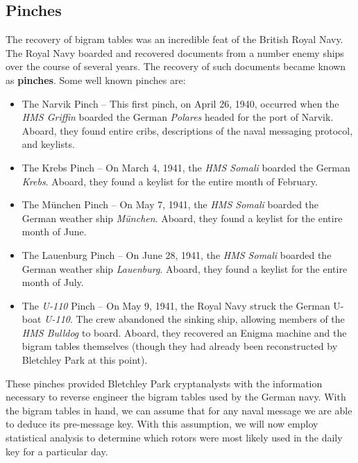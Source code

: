   \subsection{Pinches}
  The recovery of bigram tables was an incredible feat of the British Royal Navy. The Royal Navy boarded and recovered documents from a number enemy ships over the course of several years. The recovery of such documents became known as {\bf{pinches}}. Some well known pinches are: 
  \begin{itemize}
      \item The Narvik Pinch -- This first pinch, on April 26, 1940, occurred when the \emph{HMS Griffin} boarded the German \emph{Polares} headed for the port of Narvik. Aboard, they found entire cribs, descriptions of the naval messaging protocol, and keylists. 
      \item The Krebs Pinch -- On March 4, 1941, the \emph{HMS Somali} boarded the German \emph{Krebs}. Aboard, they found a keylist for the entire month of February. 
      \item The München Pinch -- On May 7, 1941, the \emph{HMS Somali} boarded the German weather ship \emph{München}. Aboard, they found a keylist for the entire month of June.
      \item The Lauenburg Pinch -- On June 28, 1941, the \emph{HMS Somali} boarded the German weather ship \emph{Lauenburg}. Aboard, they found a keylist for the entire month of July.
       \item The \emph{U-110} Pinch -- On May 9, 1941, the Royal Navy struck the German U-boat \emph{U-110}. The crew abandoned the sinking ship, allowing members of the \emph{HMS Bulldog} to board. Aboard, they recovered an Enigma machine and the bigram tables themselves (though they had already been reconstructed by Bletchley Park at this point). 
  \end{itemize}
  \noindent These pinches provided Bletchley Park cryptanalysts with the information necessary to reverse engineer the bigram tables used by the German navy. With the bigram tables in hand, we can assume that for any
  naval message we are able to deduce its pre-message key. With this
  assumption, we will now employ statistical analysis to determine
  which rotors were most likely used in the daily key for a particular day.

